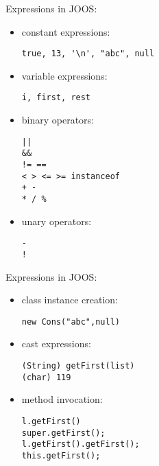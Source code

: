 \begin{slide*}
Expressions in JOOS:

\begin{itemize}
\item constant expressions:
\begin{scriptsize}
\begin{verbatim}
true, 13, '\n', "abc", null
\end{verbatim}
\end{scriptsize}
\item variable expressions:
\begin{scriptsize}
\begin{verbatim}
i, first, rest
\end{verbatim}
\end{scriptsize}
\item binary operators:
\begin{scriptsize}
\begin{verbatim}
||
&&
!= ==
< > <= >= instanceof
+ -
* / %
\end{verbatim}
\end{scriptsize}
\item unary operators:
\begin{scriptsize}
\begin{verbatim}
-
!
\end{verbatim}
\end{scriptsize}
\end{itemize}
\vfil
\end{slide*}

\begin{slide*}
Expressions in JOOS:

\begin{itemize}
\item class instance creation:
\begin{scriptsize}
\begin{verbatim}
new Cons("abc",null)
\end{verbatim}
\end{scriptsize}
\item cast expressions:
\begin{scriptsize}
\begin{verbatim}
(String) getFirst(list)
(char) 119
\end{verbatim}
\end{scriptsize}
\item method invocation:
\begin{scriptsize}
\begin{verbatim}
l.getFirst()
super.getFirst();
l.getFirst().getFirst();
this.getFirst();
\end{verbatim}
\end{scriptsize}
\end{itemize}
\vfil
\end{slide*}

